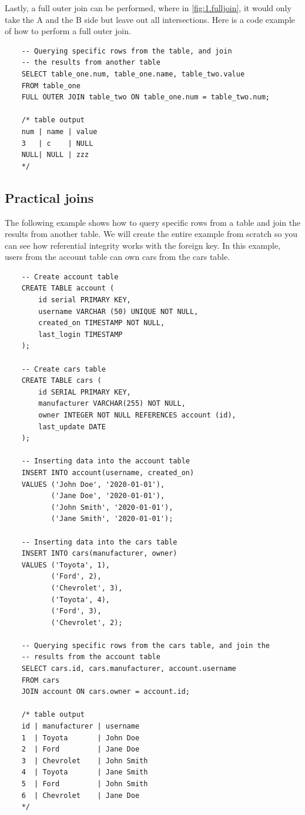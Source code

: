 Lastly, a full outer join can be performed, where in \cref{fig:1.fulljoin}, it would only take the A and the B side but leave out all intersections. Here is a code example of how to perform a full outer join.

\begin{verbatim}
    -- Querying specific rows from the table, and join 
    -- the results from another table
    SELECT table_one.num, table_one.name, table_two.value
    FROM table_one
    FULL OUTER JOIN table_two ON table_one.num = table_two.num;

    /* table output
    num | name | value
    3   | c    | NULL
    NULL| NULL | zzz
    */
\end{verbatim}

\subsection{Practical joins}

The following example shows how to query specific rows from a table and join the results from another table. We will create the entire example from scratch so you can see how referential integrity works with the foreign key. In this example, users from the account table can own cars from the cars table.

\begin{verbatim}
    -- Create account table
    CREATE TABLE account (
        id serial PRIMARY KEY,
        username VARCHAR (50) UNIQUE NOT NULL,
        created_on TIMESTAMP NOT NULL, 
        last_login TIMESTAMP
    );

    -- Create cars table
    CREATE TABLE cars (
        id SERIAL PRIMARY KEY,
        manufacturer VARCHAR(255) NOT NULL,
        owner INTEGER NOT NULL REFERENCES account (id),
        last_update DATE
    );

    -- Inserting data into the account table
    INSERT INTO account(username, created_on)
    VALUES ('John Doe', '2020-01-01'),
           ('Jane Doe', '2020-01-01'),
           ('John Smith', '2020-01-01'),
           ('Jane Smith', '2020-01-01');

    -- Inserting data into the cars table
    INSERT INTO cars(manufacturer, owner)
    VALUES ('Toyota', 1),
           ('Ford', 2),
           ('Chevrolet', 3),
           ('Toyota', 4),
           ('Ford', 3),
           ('Chevrolet', 2);

    -- Querying specific rows from the cars table, and join the 
    -- results from the account table
    SELECT cars.id, cars.manufacturer, account.username
    FROM cars
    JOIN account ON cars.owner = account.id;

    /* table output
    id | manufacturer | username
    1  | Toyota       | John Doe
    2  | Ford         | Jane Doe
    3  | Chevrolet    | John Smith
    4  | Toyota       | Jane Smith
    5  | Ford         | John Smith
    6  | Chevrolet    | Jane Doe
    */
\end{verbatim}

